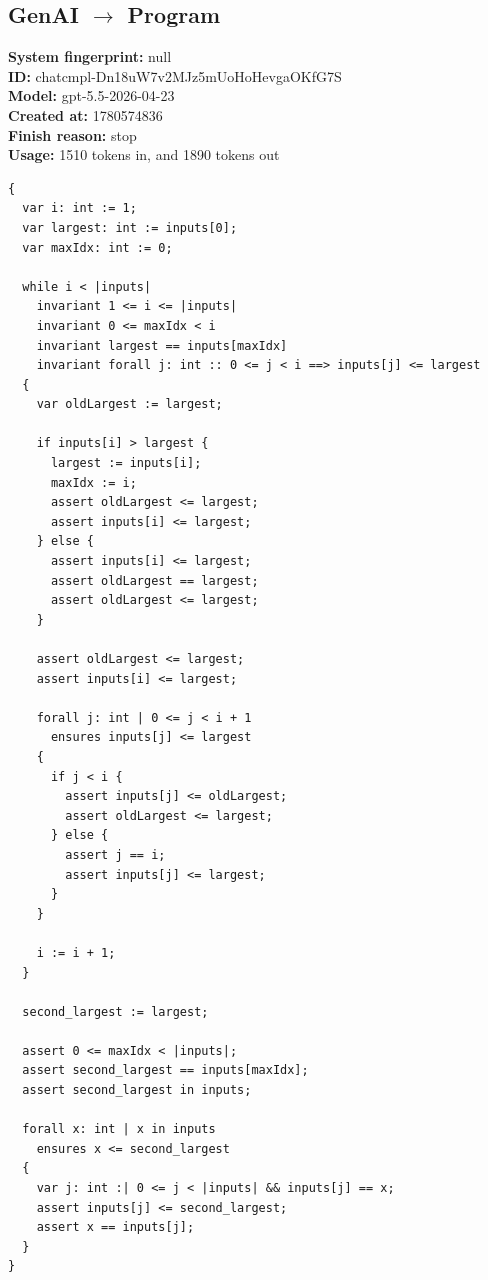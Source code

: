 \documentclass{article}
\begin{document}
\subsection*{GenAI $\rightarrow$ Program}
\textbf{System fingerprint: }null
\\\textbf{ID: }chatcmpl-Dn18uW7v2MJz5mUoHoHevgaOKfG7S
\\\textbf{Model: }gpt-5.5-2026-04-23
\\\textbf{Created at: }1780574836
\\\textbf{Finish reason: }stop
\\\textbf{Usage: }1510 tokens in, and 1890 tokens out
\begin{lstlisting}
{
  var i: int := 1;
  var largest: int := inputs[0];
  var maxIdx: int := 0;

  while i < |inputs|
    invariant 1 <= i <= |inputs|
    invariant 0 <= maxIdx < i
    invariant largest == inputs[maxIdx]
    invariant forall j: int :: 0 <= j < i ==> inputs[j] <= largest
  {
    var oldLargest := largest;

    if inputs[i] > largest {
      largest := inputs[i];
      maxIdx := i;
      assert oldLargest <= largest;
      assert inputs[i] <= largest;
    } else {
      assert inputs[i] <= largest;
      assert oldLargest == largest;
      assert oldLargest <= largest;
    }

    assert oldLargest <= largest;
    assert inputs[i] <= largest;

    forall j: int | 0 <= j < i + 1
      ensures inputs[j] <= largest
    {
      if j < i {
        assert inputs[j] <= oldLargest;
        assert oldLargest <= largest;
      } else {
        assert j == i;
        assert inputs[j] <= largest;
      }
    }

    i := i + 1;
  }

  second_largest := largest;

  assert 0 <= maxIdx < |inputs|;
  assert second_largest == inputs[maxIdx];
  assert second_largest in inputs;

  forall x: int | x in inputs
    ensures x <= second_largest
  {
    var j: int :| 0 <= j < |inputs| && inputs[j] == x;
    assert inputs[j] <= second_largest;
    assert x == inputs[j];
  }
}
\end{lstlisting}
\end{document}
